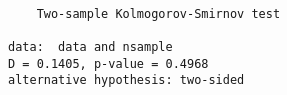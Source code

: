 \begin{verbatim} 

	Two-sample Kolmogorov-Smirnov test

data:  data and nsample
D = 0.1405, p-value = 0.4968
alternative hypothesis: two-sided

\end{verbatim}